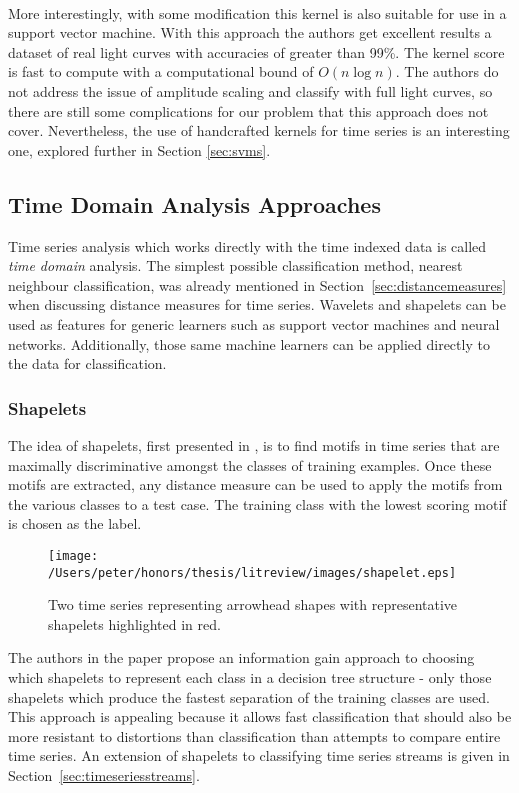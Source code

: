 	\paragraph{}
	More interestingly, with some modification this kernel is also suitable for use in a support vector machine. With this approach the authors get excellent results a dataset of real light curves with accuracies of greater than 99\%. The kernel score is fast to compute with a computational bound of $O(n\log n)$. The authors do not address the issue of amplitude scaling and classify with full light curves, so there are still some complications for our problem that this approach does not cover. Nevertheless, the use of handcrafted kernels for time series is an interesting one, explored further in Section \ref{sec:svms}.
	
	\subsection{Time Domain Analysis Approaches}
	Time series analysis which works directly with the time indexed data is called \emph{time domain} analysis. The simplest possible classification method, nearest neighbour classification, was already mentioned in Section~\ref{sec:distancemeasures} when discussing distance measures for time series. Wavelets and shapelets can be used as features for generic learners such as support vector machines and neural networks. Additionally, those same machine learners can be applied directly to the data for classification.

	\subsubsection{Shapelets}
	The idea of shapelets, first presented in \citep{ye2009time}, is to find motifs in time series that are maximally discriminative amongst the classes of training examples. Once these motifs are extracted, any distance measure can be used to apply the motifs from the various classes to a test case. The training class with the lowest scoring motif is chosen as the label.
	\begin{figure}[ht!]
	\centering
	\texttt{[image: /Users/peter/honors/thesis/litreview/images/shapelet.eps]}
	\caption{Two time series representing arrowhead shapes with representative shapelets highlighted in red.}
	\label{fig:shapelets}
	\end{figure}
	The authors in the paper propose an information gain approach to choosing which shapelets to represent each class in a decision tree structure - only those shapelets which produce the fastest separation of the training classes are used. This approach is appealing because it allows fast classification that should also be more resistant to distortions than classification than attempts to compare entire time series. An extension of shapelets to classifying time series streams is given in Section~\ref{sec:timeseriesstreams}.

